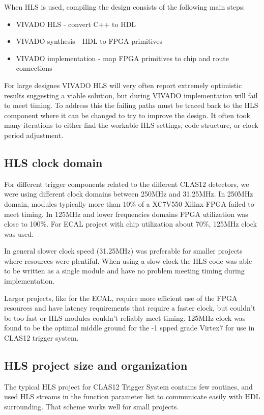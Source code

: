 When HLS is used, compiling the design consists of the following main steps:

\begin{itemize}
	\item VIVADO HLS - convert C++ to HDL
	\item VIVADO synthesis - HDL to FPGA primitives
	\item VIVADO implementation - map FPGA primitives to chip and route connections
\end{itemize}

For large designes VIVADO HLS will very often report extremely optimistic results suggesting a viable solution, but during VIVADO implementation will fail to meet timing. To address this the failing paths must be traced back to the HLS component where it can be changed to try to improve the design. It often took many iterations to either find the workable HLS settings, code structure, or clock period adjustment.

\subsection{HLS clock domain}

For different trigger components related to the different CLAS12 detectors, we were using different clock domains between 250MHz and 31.25MHz. In 250MHz domain, modules typically more than 10\% of a XC7V550 Xilinx FPGA failed to meet timing. In 125MHz and lower frequencies domains FPGA utilization was close to 100\%. For ECAL project with chip utilization about 70\%, 125MHz clock was used.

In general slower clock speed (31.25MHz) was preferable for smaller projects where resources were plentiful. When using a slow clock the HLS code was able to be written as a single module and have no problem meeting timing during implementation.

Larger projects, like for the ECAL, require more efficient use of the FPGA resources and have latency requirements that require a faster clock, but couldn't be too fast or HLS modules couldn't reliably meet timing. 125MHz clock was found to be the optimal middle ground for the -1 spped grade Virtex7 for use in CLAS12 trigger system.


\subsection{HLS project size and organization}

The typical HLS project for CLAS12 Trigger System contains few routines, and used HLS streams in the function parameter list to communicate easily with HDL surrounding. That scheme works well for small projects.

